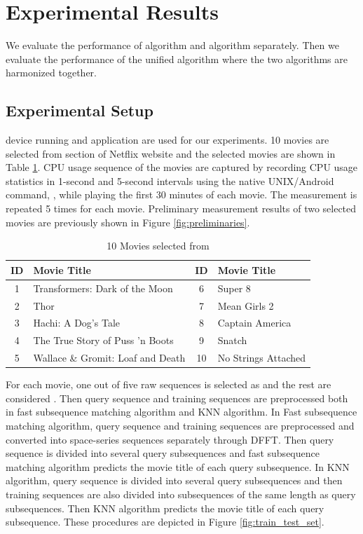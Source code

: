 \section{Experimental Results}
\label{sec:experiments}

We evaluate the performance of  algorithm and  algorithm separately.
Then we evaluate the performance of the unified algorithm where the two algorithms are harmonized together. 

\subsection{Experimental Setup}
 device running  and  application are used for our experiments. 
10 movies are selected from  section of Netflix website and the selected movies are shown in Table \ref{tab:movies}.
CPU usage sequence of the movies are captured by recording CPU usage statistics in 1-second and 5-second intervals using the native UNIX/Android command, , while playing the first 30 minutes of each movie. 
The measurement is repeated 5 times for each movie.
Preliminary measurement results of two selected movies are previously shown in Figure \ref{fig:preliminaries}.

\begin{table}[h!]
\begin{center}
\begin{tabular}{|c | m{5cm} ||c| m{5cm}|}
\hline
ID & Movie Title & ID & Movie Title \\ 
\hline
1 & Transformers: Dark of the Moon 		& 6 & Super 8\\
2 & Thor					& 7 & Mean Girls 2 \\
3 & Hachi: A Dog's Tale 			& 8 & Captain America \\
4 & The True Story of Puss 'n Boots 		& 9 &  Snatch \\
5 & Wallace \& Gromit: Loaf and Death 	& 10 & No Strings Attached \\
\hline
\end{tabular}
\end{center}
\caption{10 Movies selected from }
\label{tab:movies}
\end{table}

For each movie, one out of five raw sequences is selected as  and the rest are considered .
Then query sequence and training sequences are preprocessed both in fast subsequence matching algorithm and KNN algorithm. 
In Fast subsequence matching algorithm, query sequence and training sequences are preprocessed and converted into space-series sequences separately through DFFT.
Then query sequence is divided into several query subsequences and fast subsequence matching algorithm predicts the movie title of each query subsequence. 
In KNN algorithm, query sequence is divided into several query subsequences and then training sequences are also divided into subsequences of the same length as query subsequences. 
Then KNN algorithm predicts the movie title of each query subsequence. 
These procedures are depicted in Figure \ref{fig:train_test_set}.

